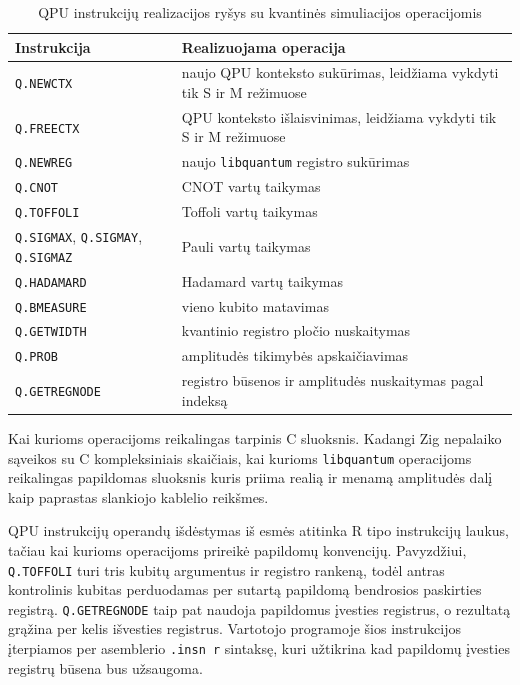 \begin{table}[h]
    \centering
    \begin{tabularx}{\textwidth}{|l|X|}
        \hline
        \textbf{Instrukcija} & \textbf{Realizuojama operacija} \\
        \hline
        \texttt{Q.NEWCTX} & naujo QPU konteksto sukūrimas, leidžiama vykdyti tik S ir M režimuose \\
        \hline
        \texttt{Q.FREECTX} & QPU konteksto išlaisvinimas, leidžiama vykdyti tik S ir M režimuose \\
        \hline
        \texttt{Q.NEWREG} & naujo \texttt{libquantum} registro sukūrimas \\
        \hline
        \texttt{Q.CNOT} & CNOT vartų taikymas \\
        \hline
        \texttt{Q.TOFFOLI} & Toffoli vartų taikymas \\
        \hline
        \texttt{Q.SIGMAX}, \texttt{Q.SIGMAY}, \texttt{Q.SIGMAZ} & Pauli vartų taikymas \\
        \hline
        \texttt{Q.HADAMARD} & Hadamard vartų taikymas \\
        \hline
        \texttt{Q.BMEASURE} & vieno kubito matavimas \\
        \hline
        \texttt{Q.GETWIDTH} & kvantinio registro pločio nuskaitymas \\
        \hline
        \texttt{Q.PROB} & amplitudės tikimybės apskaičiavimas \\
        \hline
        \texttt{Q.GETREGNODE} & registro būsenos ir amplitudės nuskaitymas pagal indeksą \\
        \hline
    \end{tabularx}
    \caption{QPU instrukcijų realizacijos ryšys su kvantinės simuliacijos operacijomis}
    \label{tab:qpu-realizacijos-rysys}
\end{table}

Kai kurioms operacijoms reikalingas tarpinis C sluoksnis. Kadangi Zig nepalaiko sąveikos su C kompleksiniais skaičiais, kai kurioms \texttt{libquantum} operacijoms reikalingas papildomas sluoksnis kuris priima realią ir menamą amplitudės dalį kaip paprastas slankiojo kablelio reikšmes.

QPU instrukcijų operandų išdėstymas iš esmės atitinka R tipo instrukcijų laukus, tačiau kai kurioms operacijoms prireikė papildomų konvencijų. Pavyzdžiui, \texttt{Q.TOFFOLI} turi tris kubitų argumentus ir registro rankeną, todėl antras kontrolinis kubitas perduodamas per sutartą papildomą bendrosios paskirties registrą. \texttt{Q.GETREGNODE} taip pat naudoja papildomus įvesties registrus, o rezultatą grąžina per kelis išvesties registrus. Vartotojo programoje šios instrukcijos įterpiamos per asemblerio \texttt{.insn r} sintaksę, kuri užtikrina kad papildomų įvesties registrų būsena bus užsaugoma.

